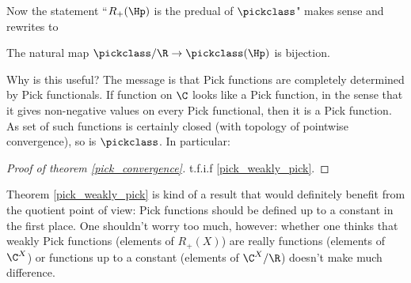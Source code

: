 Now the statement ``$R_{+}(\Hp)$ is the predual of $\pickclass$" makes sense and rewrites to

\begin{lause}\label{pick_weakly_pick}
	The natural map $\pickclass/\R \to \pickclass(\Hp)$ is bijection.
\end{lause}

Why is this useful? The message is that Pick functions are completely determined by Pick functionals. If function on $\C$ looks like a Pick function, in the sense that it gives non-negative values on every Pick functional, then it is a Pick function. As set of such functions is certainly closed (with topology of pointwise convergence), so is $\pickclass$. In particular:

\begin{proof}[Proof of theorem \ref{pick_convergence}]
	t.f.i.f \ref{pick_weakly_pick}.
\end{proof}

Theorem \ref{pick_weakly_pick} is kind of a result that would definitely benefit from the quotient point of view: Pick functions should be defined up to a constant in the first place. One shouldn't worry too much, however: whether one thinks that weakly Pick functions (elements of $R_{+}(X)$) are really functions (elements of $\C^{X}$) or functions up to a constant (elements of $\C^{X}/\R$) doesn't make much difference.

